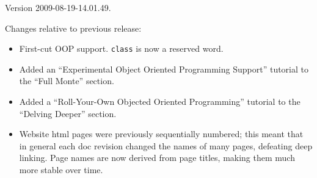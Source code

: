 Version 2009-08-19-14.01.49.

Changes relative to previous release:
\begin{itemize}

\item First-cut OOP support.  {\tt class} is now a reserved word.
\item Added an ``Experimental Object Oriented Programming Support'' tutorial to the ``Full Monte'' section.
\item Added a ``Roll-Your-Own Objected Oriented Programming'' tutorial to the ``Delving Deeper'' section.

\item Website html pages were previously sequentially numbered; this meant that 
in general each doc revision changed the names of many pages, defeating deep 
linking.  Page names are now derived from page titles, making them much more 
stable over time.


\end{itemize}
